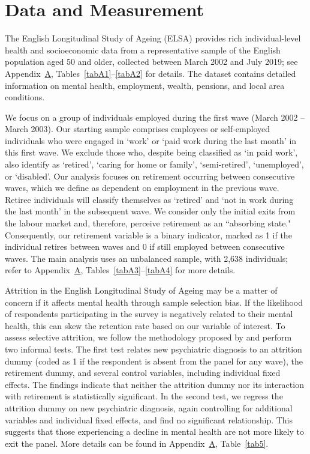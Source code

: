 \documentclass[arguments, manuscript, 11pt]{aastex631}
\begin{document}
\section{Data and Measurement} \label{sec:data}

The English Longitudinal Study of Ageing (ELSA) provides rich individual-level health and socioeconomic data from a representative sample of the English population aged 50 and older, collected between March 2002 and July 2019; see Appendix~\hyperref[sec:appendixa]{A}, Tables~\ref{tabA1}--\ref{tabA2} for details. The dataset contains detailed information on mental health, employment, wealth, pensions, and local area conditions.

We focus on a group of individuals employed during the first wave (March 2002 – March 2003). Our starting sample comprises employees or self-employed individuals who were engaged in ‘work’ or ‘paid work during the last month’ in this first wave. We exclude those who, despite being classified as ‘in paid work’, also identify as ‘retired’, ‘caring for home or family’, ‘semi-retired’, ‘unemployed’, or ‘disabled’. Our analysis focuses on retirement occurring between consecutive waves, which we define as dependent on employment in the previous wave. Retiree individuals will classify themselves as ‘retired’ and ‘not in work during the last month’ in the subsequent wave. We consider only the initial exits from the labour market and, therefore, perceive retirement as an “absorbing state." Consequently, our retirement variable is a binary indicator, marked as 1 if the individual retires between waves and 0 if still employed between consecutive waves. The main analysis uses an unbalanced sample, with 2,638 individuals; refer to Appendix~\hyperref[sec:appendixa]{A}, Tables~\ref{tabA3}--\ref{tabA4} for more details.

Attrition in the English Longitudinal Study of Ageing may be a matter of concern if it affects mental health through sample selection bias. If the likelihood of respondents participating in the survey is negatively related to their mental health, this can skew the retention rate based on our variable of interest. To assess selective attrition, we follow the methodology proposed by \cite{lindeboom2002econometric} and perform two informal tests. The first test relates new psychiatric diagnosis to an attrition dummy (coded as 1 if the respondent is absent from the panel for any wave), the retirement dummy, and several control variables, including individual fixed effects. The findings indicate that neither the attrition dummy nor its interaction with retirement is statistically significant. In the second test, we regress the attrition dummy on new psychiatric diagnosis, again controlling for additional variables and individual fixed effects, and find no significant relationship. This suggests that those experiencing a decline in mental health are not more likely to exit the panel. More details can be found in Appendix~\hyperref[sec:appendixa]{A}, Table~\ref{tab5}.
\end{document}
